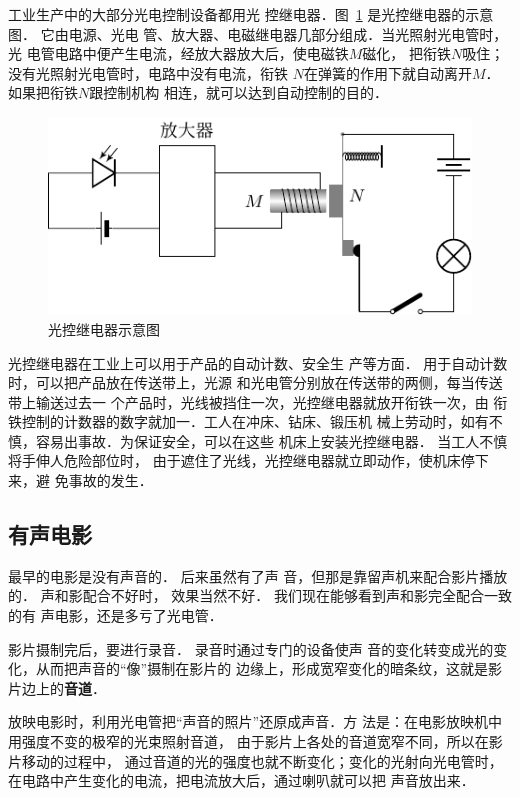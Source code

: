 工业生产中的大部分光电控制设备都用光
控继电器．图~\ref{fig_C_7-4} 是光控继电器的示意图．
它由电源、光电
管、放大器、电磁继电器几部分组成．当光照射光电管时，光
电管电路中便产生电流，经放大器放大后，使电磁铁$M$磁化，
把衔铁$N$吸住；没有光照射光电管时，电路中没有电流，衔铁
$N$在弹簧的作用下就自动离开$M$．如果把衔铁$N$跟控制机构
相连，就可以达到自动控制的目的．
\begin{figure}[htbp]
    \centering
    \includegraphics{fig/C/7-4.pdf}
    \caption{光控继电器示意图}\label{fig_C_7-4}
\end{figure}


光控继电器在工业上可以用于产品的自动计数、安全生
产等方面．
用于自动计数时，可以把产品放在传送带上，光源
和光电管分别放在传送带的两侧，每当传送带上输送过去一
个产品时，光线被挡住一次，光控继电器就放开衔铁一次，由
衔铁控制的计数器的数字就加一．工人在冲床、钻床、锻压机
械上劳动时，如有不慎，容易出事故．为保证安全，可以在这些
机床上安装光控继电器．
当工人不慎将手伸人危险部位时，
由于遮住了光线，光控继电器就立即动作，使机床停下来，避
免事故的发生．


\subsection{有声电影}

最早的电影是没有声音的．
后来虽然有了声
音，但那是靠留声机来配合影片播放的．
声和影配合不好时，
效果当然不好．
我们现在能够看到声和影完全配合一致的有
声电影，还是多亏了光电管．

影片摄制完后，要进行录音．
录音时通过专门的设备使声
音的变化转变成光的变化，从而把声音的“像”摄制在影片的
边缘上，形成宽窄变化的暗条纹，这就是影片边上的\textbf{音道}．

放映电影时，利用光电管把“声音的照片”还原成声音．方
法是：在电影放映机中用强度不变的极窄的光束照射音道，
由于影片上各处的音道宽窄不同，所以在影片移动的过程中，
通过音道的光的强度也就不断变化；变化的光射向光电管时，
在电路中产生变化的电流，把电流放大后，通过喇叭就可以把
声音放出来．


